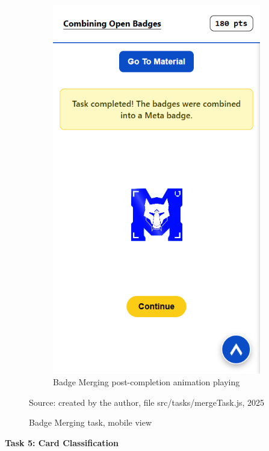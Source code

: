 \begin{figure}[H]
\begin{subfigure}[]{0.4\textwidth}
    \includegraphics[width=\textwidth]{Media/merge2.png}
    \caption{Badge Merging post-completion animation playing}
  \end{subfigure}
  \caption{Badge Merging task, mobile view}
  \label{fig:mergeTask}
  {\raggedright \small{Source: created by the author, file src/tasks/mergeTask.js}, 2025\par}
\end{figure}


\textbf{Task 5: Card Classification}

